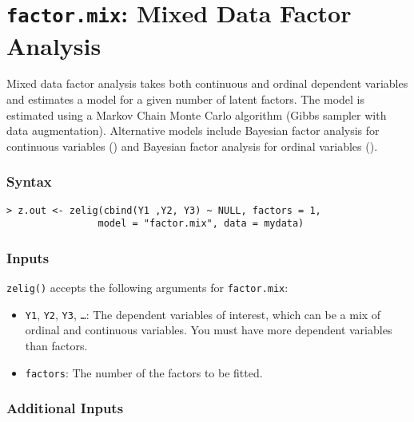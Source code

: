 \section{\texttt{factor.mix}: Mixed Data Factor Analysis}\label{factor.mix}

Mixed data factor analysis takes both continuous and ordinal dependent
variables and estimates a model for a given number of latent factors.
The model is estimated using a Markov Chain Monte Carlo algorithm
(Gibbs sampler with data augmentation).  Alternative models include
Bayesian factor analysis for continuous variables
() and Bayesian factor analysis for ordinal
variables ().  

\subsubsection{Syntax}
\begin{verbatim}
> z.out <- zelig(cbind(Y1 ,Y2, Y3) ~ NULL, factors = 1, 
                model = "factor.mix", data = mydata)
\end{verbatim}

\subsubsection{Inputs}
{\tt zelig()} accepts the following arguments for {\tt factor.mix}:  
\begin{itemize}

\item \texttt{Y1}, {\tt Y2}, \texttt{Y3}, {\tt \dots}: The dependent variables of
interest, which can be a mix of ordinal and continuous variables.  You
must have more dependent variables than factors.

\item \texttt{factors}: The number of the factors to be fitted.

\end{itemize}


\subsubsection{Additional Inputs}

